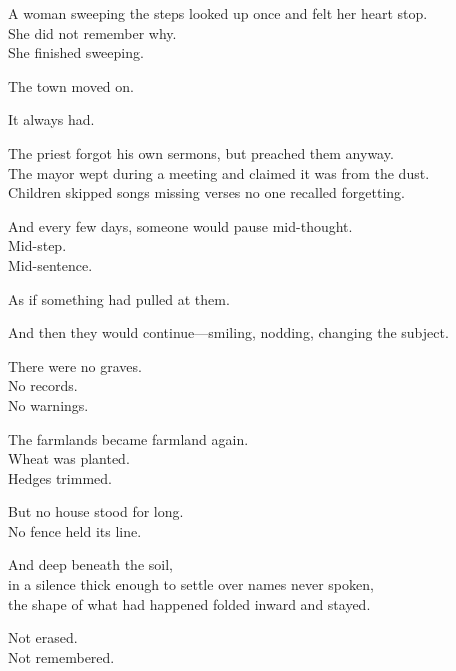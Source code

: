 \documentclass[12pt]{article}
\begin{document}
\vspace{0.5em}
A woman sweeping the steps looked up once and felt her heart stop.\\
She did not remember why.\\
She finished sweeping.

\vspace{0.5em}
The town moved on.

\vspace{0.5em}
It always had.

\vspace{0.5em}
The priest forgot his own sermons, but preached them anyway.\\
The mayor wept during a meeting and claimed it was from the dust.\\
Children skipped songs missing verses no one recalled forgetting.

\vspace{0.5em}
And every few days, someone would pause mid-thought.\\
Mid-step.\\
Mid-sentence.

\vspace{0.5em}
As if something had pulled at them.

\vspace{0.5em}
And then they would continue---smiling, nodding, changing the subject.

\vspace{0.5em}
There were no graves.\\
No records.\\
No warnings.

\vspace{0.5em}
The farmlands became farmland again.\\
Wheat was planted.\\
Hedges trimmed.

\vspace{0.5em}
But no house stood for long.\\
No fence held its line.

\vspace{0.5em}
And deep beneath the soil,\\
in a silence thick enough to settle over names never spoken,\\
the shape of what had happened folded inward and stayed.

\vspace{0.5em}
Not erased.\\
Not remembered.
\end{document}
